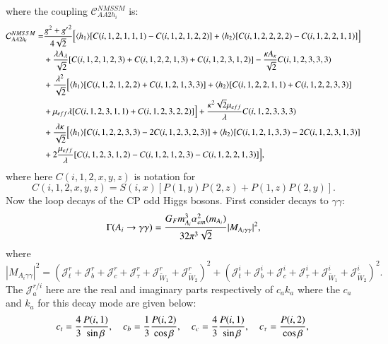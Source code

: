 \documentclass[final,3p,times]{elsarticle}
\begin{document}
where the coupling $\mathcal{C}_{AA2h_i}^{NMSSM}$ is:
\begin{equation}
\begin{aligned}
\mathcal{C}_{AA2h_i}^{NMSSM} = & {g^2 + {g'}^2 \over 4 \sqrt{2}} \Big[ \langle h_1 \rangle [C(i,1,2,1,1,1) -C(i,1,2,1,2,2)] + \langle h_2 \rangle [C(i,1,2,2,2,2) - C(i,1,2,2,1,1)] \Big] \\ & + {\lambda A_{\lambda} \over \sqrt{2}}  [ C(i,1,2,1,2,3) + C(i,1,2,2,1,3) + C(i,1,2,3,1,2)] - {\kappa A_{\kappa} \over \sqrt{2}} C(i,1,2,3,3,3) \\ & + {\lambda^2 \over \sqrt{2}} \Big [  \langle h_1 \rangle[C(i,1,2,1,2,2) + C(i,1,2,1,3,3)] + \langle h_2 \rangle [C(i,1,2,2,1,1) + C(i,1,2,2,3,3)] \\ & + \mu_{eff} \lambda [C(i,1,2,3,1,1) + C(i,1,2,3,2,2)] \Big]  + {\kappa^2 \sqrt{2} \mu_{eff} \over \lambda}C(i,1,2,3,3,3) \\ & + {\lambda \kappa \over \sqrt{2}}\Big[ \langle h_1 \rangle [C(i,1,2,2,3,3) - 2C(i,1,2,3,2,3)] + \langle h_2 \rangle [ C(i,1,2,1,3,3) - 2 C(i,1,2,3,1,3)] \\ & + 2{\mu_{eff} \over \lambda} [C(i,1,2,3,1,2)-C(i,1,2,1,2,3)-C(i,1,2,2,1,3)]\Big],
\end{aligned}
\end{equation}
where here $C(i,1,2,x,y,z)$ is notation for
\begin{equation} \label{CAA2hi}
C(i,1,2,x,y,z) = S(i,x)[P(1,y)P(2,z) + P(1,z)P(2,y)].
\end{equation}
Now the loop decays of the CP odd Higgs bosons. First consider decays to $\gamma\gamma$:
\begin{equation} \label{AgamgamNMSSM}
\Gamma(A_i \rightarrow \gamma \gamma) = {G_{F} m_{A_i}^3 \alpha_{em}^2 (m_{A_i})  \over 32 \pi^3 \sqrt{2}} |M_{A_i \gamma \gamma}|^2,
\end{equation}
where
\begin{equation}
|M_{A_i \gamma \gamma}|^2 = (\mathcal{J}_{t}^{r} + \mathcal{J}_{b}^{r} + \mathcal{J}_{c}^{r} + \mathcal{J}_{\tau}^{r} + \mathcal{J}_{\tilde{W}_1}^{r} + \mathcal{J}_{\tilde{W}_2}^{r})^2 + (\mathcal{J}_{t}^{i} + \mathcal{J}_{b}^{i} + \mathcal{J}_{c}^{i} + \mathcal{J}_{\tau}^{i} + \mathcal{J}_{\tilde{W}_1}^{i} + \mathcal{J}_{\tilde{W}_2}^{i})^2.
\end{equation}
The $\mathcal{J}_{a}^{r/i}$ here are the real and imaginary parts respectively of $c_{a}k_{a}$ where the $c_{a}$ and $k_{a}$ for this decay mode are given below:
\begin{equation}
c_{t} = {4 \over 3}{P(i,1) \over \sin\beta}, \quad \quad\\
c_{b} = {1 \over 3}{P(i,2) \over \cos\beta}, \quad \quad\\
c_{c} = {4 \over 3}{P(i,1) \over \sin\beta}, \quad \quad\\
c_{\tau} = {P(i,2) \over \cos\beta} ,\\
\end{equation}
\end{document}
